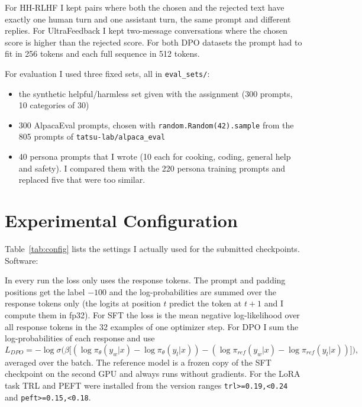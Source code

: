 \documentclass[11pt,a4paper]{article}
\begin{document}
\begin{table}[!htbp]
\centering
\caption{Training data after filtering. The id of every example is saved in \texttt{results/data/data\_manifest.json}.}
\label{tab:data}
\end{table}

For HH-RLHF I kept pairs where both the chosen and the rejected text have exactly one human turn and one assistant turn, the same prompt and
different replies. For UltraFeedback I kept two-message conversations where the chosen score is higher than the rejected score. For both DPO
datasets the prompt had to fit in 256 tokens and each full sequence in 512 tokens.

For evaluation I used three fixed sets, all in \texttt{eval\_sets/}:
\begin{itemize}
\item the synthetic helpful/harmless set given with the assignment (300 prompts, 10 categories of 30)
\item 300 AlpacaEval prompts, chosen with \texttt{random.Random(42).sample} from the 805 prompts of \texttt{tatsu-lab/alpaca\_eval}
\item 40 persona prompts that I wrote (10 each for cooking, coding, general help and safety). I compared them with the 220 persona training
prompts and replaced five that were too similar.
\end{itemize}

\section{Experimental Configuration}

Table~\ref{tab:config} lists the settings I actually used for the submitted checkpoints. Software: %

\begin{table}[!htbp]
\centering
\caption{Configuration of the four training runs.}
\label{tab:config}
\end{table}

In every run the loss only uses the response tokens. The prompt and padding positions get the label $-100$ and the log-probabilities are
summed over the response tokens only (the logits at position $t$ predict the token at $t+1$ and I compute them in fp32). For SFT the loss is the
mean negative log-likelihood over all response tokens in the 32 examples of one optimizer step. For DPO I sum the log-probabilities of each
response and use
\[
L_{DPO} = -\log \sigma\Big(\beta\big[(\log \pi_\theta(y_w|x) - \log \pi_\theta(y_l|x)) - (\log \pi_{ref}(y_w|x) - \log \pi_{ref}(y_l|x))\big]\Big),
\]
averaged over the batch. The reference model is a frozen copy of the SFT checkpoint on the second GPU and always runs without gradients.
For the LoRA task TRL and PEFT were installed from the version ranges \texttt{trl>=0.19,<0.24} and \texttt{peft>=0.15,<0.18}.
\end{document}

